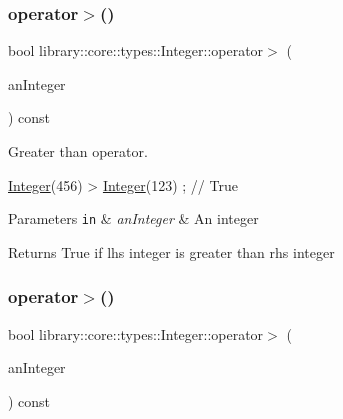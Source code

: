 \subsubsection{\texorpdfstring{operator$>$()}{operator>()}\hspace{0.1cm}{\footnotesize\ttfamily [1/2]}}
{\footnotesize\ttfamily bool library\+::core\+::types\+::\+Integer\+::operator$>$ (\begin{DoxyParamCaption}\item[{const \hyperlink{classlibrary_1_1core_1_1types_1_1Integer}{Integer} \&}]{an\+Integer }\end{DoxyParamCaption}) const}



Greater than operator. 


\begin{DoxyCode}
\hyperlink{classlibrary_1_1core_1_1types_1_1Integer_a6483b1c4e13e5ed6af5e7a58347efead}{Integer}(456) > \hyperlink{classlibrary_1_1core_1_1types_1_1Integer_a6483b1c4e13e5ed6af5e7a58347efead}{Integer}(123) ; \textcolor{comment}{// True}
\end{DoxyCode}



\begin{DoxyParams}[1]{Parameters}
\mbox{\tt in}  & {\em an\+Integer} & An integer \\
\hline
\end{DoxyParams}
\begin{DoxyReturn}{Returns}
True if lhs integer is greater than rhs integer 
\end{DoxyReturn}
\mbox{\label{classlibrary_1_1core_1_1types_1_1Integer_a1e0736e7d215b2ad2e7291a983490bf5}} 
\subsubsection{\texorpdfstring{operator$>$()}{operator>()}\hspace{0.1cm}{\footnotesize\ttfamily [2/2]}}
{\footnotesize\ttfamily bool library\+::core\+::types\+::\+Integer\+::operator$>$ (\begin{DoxyParamCaption}\item[{const \hyperlink{classlibrary_1_1core_1_1types_1_1Integer_a623afb1580f870fd8a1997b1c12c917d}{Integer\+::\+Value\+Type} \&}]{an\+Integer }\end{DoxyParamCaption}) const}

